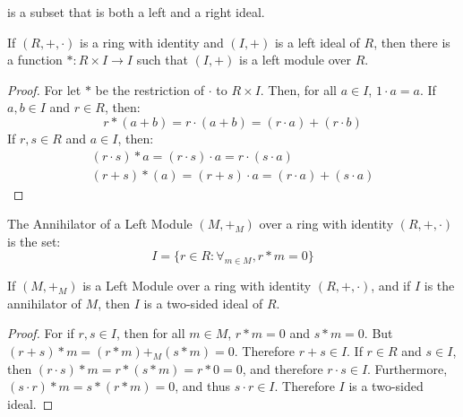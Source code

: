     is a subset that is both a left and a right ideal.
    \begin{theorem}
        If $(R,+,\cdot)$ is a ring with identity
        and $(I,+)$ is a left ideal
        of $R$, then there is a function
        $*:R\times{I}\rightarrow{I}$ such that
        $(I,+)$ is a left module over $R$.
    \end{theorem}
    \begin{proof}
        For let $*$ be the restriction of $\cdot$ to
        $R\times{I}$. Then, for all $a\in{I}$,
        $1\cdot{a}=a$. If $a,b\in{I}$ and $r\in{R}$, then:
        \begin{equation*}
            r*(a+b)
            =r\cdot(a+b)
            =(r\cdot{a})+(r\cdot{b})
        \end{equation*}
        If $r,s\in{R}$ and $a\in{I}$, then:
        \begin{gather*}
            (r\cdot{s})*a
            =(r\cdot{s})\cdot{a}
            =r\cdot(s\cdot{a})\\
            (r+s)*(a)
            =(r+s)\cdot{a}
            =(r\cdot{a})+(s\cdot{a})
        \end{gather*}
    \end{proof}
    \begin{definition}
        The Annihilator of a Left Module $(M,+_{M})$ over
        a ring with identity $(R,+,\cdot)$ is the set:
        \begin{equation*}
            I=\{r\in{R}:\forall_{m\in{M}},r*m=0\}
        \end{equation*}
    \end{definition}
    \begin{theorem}
        If $(M,+_{M})$ is a Left Module over a ring with
        identity $(R,+,\cdot)$, and if $I$ is the
        annihilator of $M$, then $I$ is a two-sided
        ideal of $R$.
    \end{theorem}
    \begin{proof}
        For if $r,s\in{I}$, then for all $m\in{M}$,
        $r*m=0$ and $s*m=0$. But $(r+s)*m=(r*m)+_{M}(s*m)=0$.
        Therefore $r+s\in{I}$. If $r\in{R}$ and $s\in{I}$,
        then $(r\cdot{s})*m=r*(s*m)=r*0=0$, and therefore
        $r\cdot{s}\in{I}$. Furthermore,
        $(s\cdot{r})*m=s*(r*m)=0$, and thus $s\cdot{r}\in{I}$.
        Therefore $I$ is a two-sided ideal.
    \end{proof}